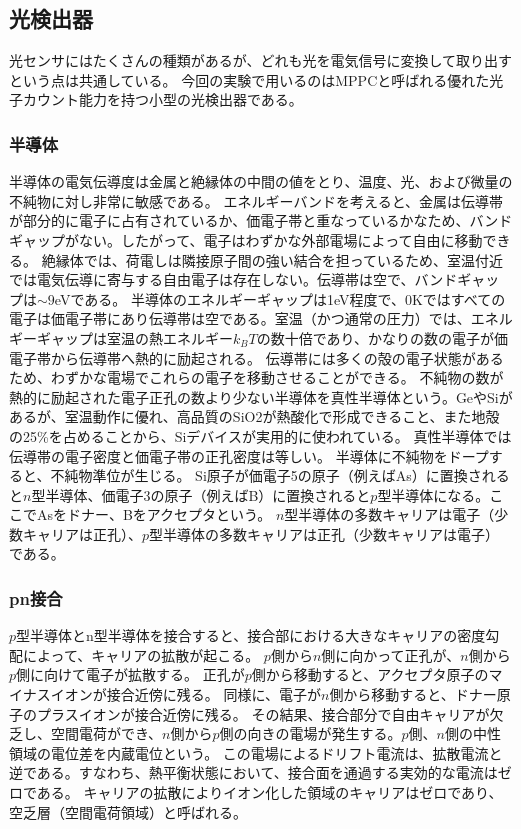 \subsection{光検出器}
光センサにはたくさんの種類があるが、どれも光を電気信号に変換して取り出すという点は共通している。
今回の実験で用いるのはMPPCと呼ばれる優れた光子カウント能力を持つ小型の光検出器である。

\subsubsection{半導体}
半導体の電気伝導度は金属と絶縁体の中間の値をとり、温度、光、および微量の不純物に対し非常に敏感である。
エネルギーバンドを考えると、金属は伝導帯が部分的に電子に占有されているか、価電子帯と重なっているかなため、バンドギャップがない。したがって、電子はわずかな外部電場によって自由に移動できる。
絶縁体では、荷電しは隣接原子間の強い結合を担っているため、室温付近では電気伝導に寄与する自由電子は存在しない。伝導帯は空で、バンドギャップは$\sim9$eVである。
半導体のエネルギーギャップは1eV程度で、0Kではすべての電子は価電子帯にあり伝導帯は空である。室温（かつ通常の圧力）では、エネルギーギャップは室温の熱エネルギー$k_BT$の数十倍であり、かなりの数の電子が価電子帯から伝導帯へ熱的に励起される。
伝導帯には多くの殻の電子状態があるため、わずかな電場でこれらの電子を移動させることができる。
不純物の数が熱的に励起された電子正孔の数より少ない半導体を真性半導体という。GeやSiがあるが、室温動作に優れ、高品質のSiO2が熱酸化で形成できること、また地殻の25\%を占めることから、Siデバイスが実用的に使われている。
真性半導体では伝導帯の電子密度と価電子帯の正孔密度は等しい。
半導体に不純物をドープすると、不純物準位が生じる。
Si原子が価電子5の原子（例えばAs）に置換されると$n$型半導体、価電子3の原子（例えばB）に置換されると$p$型半導体になる。ここでAsをドナー、Bをアクセプタという。
$n$型半導体の多数キャリアは電子（少数キャリアは正孔）、$p$型半導体の多数キャリアは正孔（少数キャリアは電子）である。

\subsubsection{pn接合}
$p$型半導体とn型半導体を接合すると、接合部における大きなキャリアの密度勾配によって、キャリアの拡散が起こる。
$p$側から$n$側に向かって正孔が、$n$側から$p$側に向けて電子が拡散する。
正孔が$p$側から移動すると、アクセプタ原子のマイナスイオンが接合近傍に残る。
同様に、電子が$n$側から移動すると、ドナー原子のプラスイオンが接合近傍に残る。
その結果、接合部分で自由キャリアが欠乏し、空間電荷ができ、$n$側から$p$側の向きの電場が発生する。$p$側、$n$側の中性領域の電位差を内蔵電位という。
この電場によるドリフト電流は、拡散電流と逆である。すなわち、熱平衡状態において、接合面を通過する実効的な電流はゼロである。
キャリアの拡散によりイオン化した領域のキャリアはゼロであり、空乏層（空間電荷領域）と呼ばれる。

